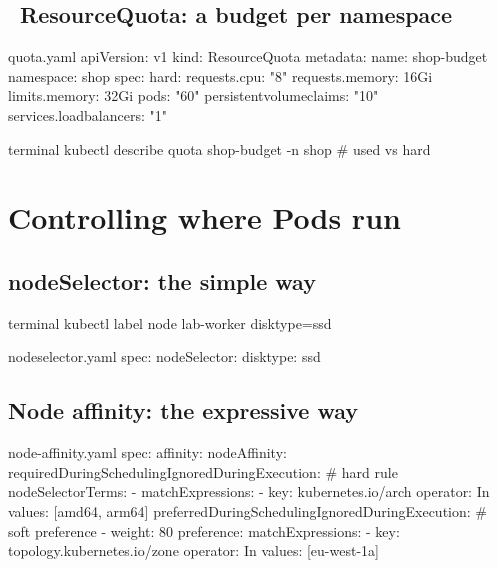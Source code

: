 \subsection{\ ResourceQuota: a budget per namespace}

\begin{yamlcode}{quota.yaml}
apiVersion: v1
kind: ResourceQuota
metadata:
  name: shop-budget
  namespace: shop
spec:
  hard:
    requests.cpu: "8"
    requests.memory: 16Gi
    limits.memory: 32Gi
    pods: "60"
    persistentvolumeclaims: "10"
    services.loadbalancers: "1"
\end{yamlcode}

\begin{bashcode}{terminal}
kubectl describe quota shop-budget -n shop     # used vs hard
\end{bashcode}

\section{Controlling where Pods run}

\subsection{nodeSelector: the simple way}

\begin{bashcode}{terminal}
kubectl label node lab-worker disktype=ssd
\end{bashcode}

\begin{yamlcode}{nodeselector.yaml}
spec:
  nodeSelector:
    disktype: ssd
\end{yamlcode}

\subsection{Node affinity: the expressive way}

\begin{yamlcode}{node-affinity.yaml}
spec:
  affinity:
    nodeAffinity:
      requiredDuringSchedulingIgnoredDuringExecution:     # hard rule
        nodeSelectorTerms:
          - matchExpressions:
              - key: kubernetes.io/arch
                operator: In
                values: [amd64, arm64]
      preferredDuringSchedulingIgnoredDuringExecution:    # soft preference
        - weight: 80
          preference:
            matchExpressions:
              - key: topology.kubernetes.io/zone
                operator: In
                values: [eu-west-1a]
\end{yamlcode}

